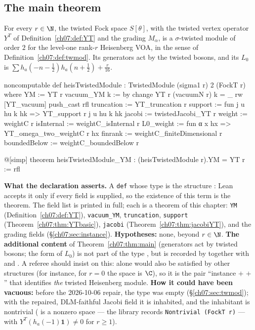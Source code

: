 \subsection{The main theorem}

\begin{theorem}\label{ch07:thm:main}
For every $r\in\N$, the twisted Fock space $S[\theta]$, with the twisted vertex operator $Y^T$ of
Definition~\ref{ch07:def:YT} and the grading $M_\alpha$, is a $\sigma$-twisted module of order $2$
for the level-one rank-$r$ Heisenberg VOA, in the sense of Definition~\ref{ch07:def:twmod}. Its
generators act by the twisted bosons, and its $L_0$ is $\sum h_a(-n-\frac12)h_a(n+\frac12) +
\frac r{16}$.
\end{theorem}

\begin{leancode}
noncomputable def heisTwistedModule : TwistedModule (sigma1 r) 2 (FockT r) where
  YM := YT r
  vacuum_YM k := by
    change YT r (vacuumN r) k = _
    rw [YT_vacuum]
    push_cast
    rfl
  truncation := YT_truncation r
  support := fun j u hu k hk => YT_support r j u hu k hk
  jacobi := twistedJacobi_YT r
  weight := weightC r
  isInternal := weightC_isInternal r
  L0_weight := fun α x hx => YT_omega_two_weightC r hx
  finrank := weightC_finiteDimensional r
  boundedBelow := weightC_boundedBelow r

@[simp] theorem heisTwistedModule_YM : (heisTwistedModule r).YM = YT r := rfl
\end{leancode}

\begin{dictionary}
\textbf{What the declaration asserts.} A \verb|def| whose type is the structure
: Lean accepts it only if every field is supplied, so
the existence of this term is the theorem. The field list is printed in full; each is a theorem
of this chapter: \verb|YM| (Definition~\ref{ch07:def:YT}), \verb|vacuum_YM|, \verb|truncation|,
\verb|support| (Theorem~\ref{ch07:thm:YTbasic}), \verb|jacobi|
(Theorem~\ref{ch07:thm:jacobiYT}), and the grading fields (\S\ref{ch07:sec:instance}).
\textbf{Hypotheses:} none, beyond $r\in\N$. \textbf{The additional content} of
Theorem~\ref{ch07:thm:main} (generators act by twisted bosons; the form of $L_0$) is not part of
the type , but is recorded by  together with
 and . A referee should insist on this:  alone
would also be satisfied by other structures (for instance, for $r=0$ the space is
$\C$), so it is the pair ``instance $+$  $+$ '' that identifies
\emph{the} twisted Heisenberg module. \textbf{How it could have been vacuous:} before the
2026-10-06 repair, the type  was empty
(\S\ref{ch07:sec:twmod}); with the repaired, DLM-faithful Jacobi field it is inhabited, and the
inhabitant is nontrivial ( is a nonzero space --- the library records
\verb|Nontrivial (FockT r)| --- with $Y^T(h_a(-1)\mathbf 1)\ne0$ for $r\ge1$).
\end{dictionary}

